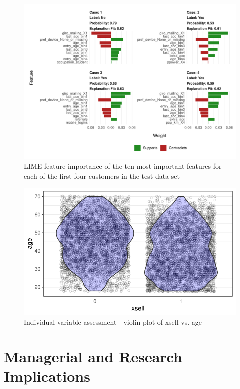 \documentclass[12pt,a4paper]{article}
\begin{document}
\begin{figure}[ht]
	\centering
  \includegraphics[scale=0.83]{figures/lime_first_four.pdf}
	\caption{LIME feature importance of the ten most important features for each of the first four customers in the test data set}
	\label{fig_lime_four}
\end{figure}

\begin{figure}[ht]
	\centering
  \includegraphics[scale=0.83]{figures/violin_age_xsell.pdf}
	\caption{Individual variable assessment---violin plot of xsell vs. age}
	\label{fig_lime_four}
\end{figure}




\section{Managerial and Research Implications}
\end{document}
